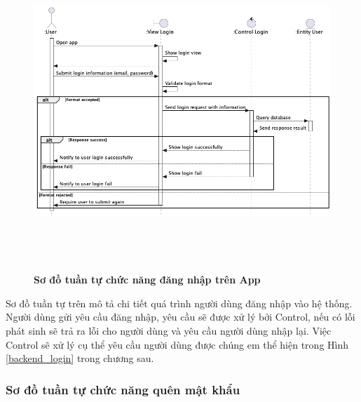     \begin{figure}[H]
         \centering
         \includegraphics[width=16cm,height=12cm]{Images/mobile_app/login.png}
         \caption[Sơ đồ tuần tự chức năng đăng nhập trên App]{\bfseries \fontsize{12pt}{0pt}
         \selectfont Sơ đồ tuần tự chức năng đăng nhập trên App}
         \label{login} %
    \end{figure}

  Sơ đồ tuần tự trên mô tả chi tiết quá trình người dùng đăng nhập vào hệ thống. Người dùng gửi yêu cầu đăng nhập, yêu cầu sẽ
  được xử lý bởi Control, nếu có lỗi phát sinh sẽ trả ra lỗi cho người dùng và yêu cầu người dùng nhập lại. Việc Control
  sẽ xử lý cụ thể yêu cầu người dùng được chúng em thể hiện trong Hình \ref{backend_login} trong chương sau.

\subsubsection{Sơ đồ tuần tự chức năng quên mật khẩu}
\mbox{}

